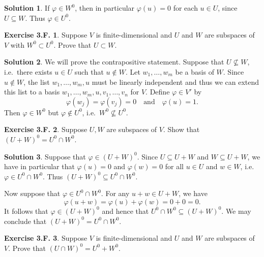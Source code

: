 \documentclass[12pt]{article}
\theoremstyle{definition}
\theoremstyle{exercise}
\newtheorem{exercise}{Exercise 3.F.}
\theoremstyle{solution}
\newtheorem*{solution}{Solution}
\newcommand{\quand}{\quad \text{and} \quad}
\begin{document}
\begin{solution}
    If \( \varphi \in W^0 \), then in particular \( \varphi(u) = 0 \) for each \( u \in U \), since \( U \subseteq W \). Thus \( \varphi \in U^0 \).
\end{solution}

\begin{exercise}
\label{ex:21}
    Suppose \( V \) is finite-dimensional and \( U \) and \( W \) are subspaces of \( V \) with \( W^0 \subset U^0 \). Prove that \( U \subset W \).
\end{exercise}

\begin{solution}
    We will prove the contrapositive statement. Suppose that \( U \not\subseteq W \), i.e.\ there exists \( u \in U \) such that \( u \not\in W \). Let \( w_1, \ldots, w_m \) be a basis of \( W \). Since \( u \not\in W \), the list \( w_1, \ldots, w_m, u \) must be linearly independent and thus we can extend this list to a basis \( w_1, \ldots, w_m, u, v_1, \ldots, v_n \) for \( V \). Define \( \varphi \in V' \) by
    \[
        \varphi(w_j) = \varphi(v_j) = 0 \quand \varphi(u) = 1.
    \]
    Then \( \varphi \in W^0 \) but \( \varphi \not\in U^0 \), i.e.\ \( W^0 \not\subseteq U^0 \).
\end{solution}

\begin{exercise}
\label{ex:22}
    Suppose \( U, W \) are subspaces of \( V \). Show that \( (U + W)^0 = U^0 \cap W^0 \).
\end{exercise}

\begin{solution}
    Suppose that \( \varphi \in (U + W)^0 \). Since \( U \subseteq U + W \) and \( W \subseteq U + W \), we have in particular that \( \varphi(u) = 0 \) and \( \varphi(w) = 0 \) for all \( u \in U \) and \( w \in W \), i.e.\ \( \varphi \in U^0 \cap W^0 \). Thus \( (U + W)^0 \subseteq U^0 \cap W^0 \).

    Now suppose that \( \varphi \in U^0 \cap W^0 \). For any \( u + w \in U + W \), we have
    \[
        \varphi(u + w) = \varphi(u) + \varphi(w) = 0 + 0 = 0.
    \]
    It follows that \( \varphi \in (U + W)^0 \) and hence that \( U^0 \cap W^0 \subseteq (U + W)^0 \). We may conclude that \( (U + W)^0 = U^0 \cap W^0 \).
\end{solution}

\begin{exercise}
\label{ex:23}
    Suppose \( V \) is finite-dimensional and \( U \) and \( W \) are subspaces of \( V \). Prove that \( (U \cap W)^0 = U^0 + W^0 \).
\end{exercise}
\end{document}
